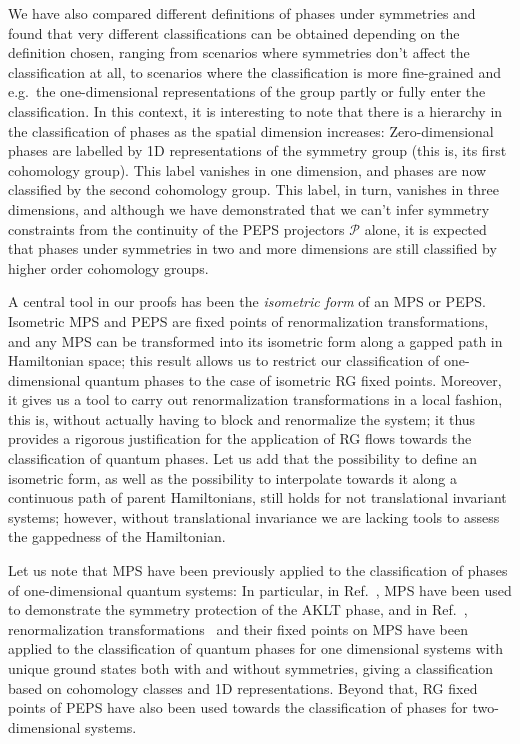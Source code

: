 \documentclass[twocolumn,superscriptaddress,prb,linenumbers]{revtex4-1}
\newcommand{\mc}[1]{\mathcal{#1}}
\begin{document}
We have also compared different definitions of phases under symmetries and
found that very different classifications can be obtained depending on the
definition chosen, ranging from scenarios where symmetries don't affect
the classification at all, to scenarios where the classification is
more fine-grained and e.g.\ the one-dimensional representations of the
group partly or fully enter the classification.  In this context, it is
interesting to note that there is a hierarchy in the classification of
phases as the spatial
dimension increases: Zero-dimensional phases are labelled by 1D
representations of the symmetry group (this is, its first cohomology
group).  This label vanishes in one dimension, and phases are now
classified by the second cohomology group. This label, in turn, vanishes
in three dimensions, and although we have demonstrated that we can't infer
symmetry constraints from the continuity of the PEPS projectors $\mc P$
alone, it is expected that phases under symmetries in two and more
dimensions are still classified by higher order cohomology
groups.~\cite{dijkgraaf:phases-cohomologies,kitaev:private}



A central tool in our proofs has been the \emph{isometric form} of an MPS
or PEPS. Isometric MPS and PEPS are fixed points of renormalization
transformations, and any MPS can be transformed into its isometric form
along a gapped path in Hamiltonian space; this result allows us to
restrict our classification of one-dimensional quantum phases to the case
of isometric RG fixed points.  Moreover, it gives us a tool to carry out
renormalization transformations in a local fashion, this is, without
actually having to block and renormalize the system; it thus provides a
rigorous justification for the application of RG flows towards the classification
of quantum phases. Let us add that the possibility to define an isometric
form, as well as the possibility to interpolate towards it along a
continuous path of parent Hamiltonians, still holds for not translational
invariant systems; however, without translational invariance we are
lacking tools to assess the gappedness of the Hamiltonian.


Let us note that MPS have been previously applied to the classification of
phases of one-dimensional quantum
systems:\cite{pollmann:symprot-1d,fidkowski:1d-fermions,chen:1d-phases-rg}
In particular, in Ref.~, MPS have been
used to demonstrate the symmetry protection of the AKLT phase, and in
Ref.~, renormalization
transformations~\cite{verstraete:renorm-MPS} and their fixed points on MPS
have been applied to the classification of quantum phases for one
dimensional systems with unique ground states both with and without
symmetries, giving a classification based on cohomology classes and 1D
representations.  Beyond that, RG fixed points of PEPS have also been used
towards the  classification of phases for two-dimensional
systems.\cite{chen:2d-rg,gu:fermion-phases-rg}
\end{document}
